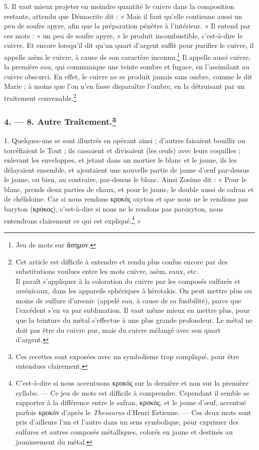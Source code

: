 \documentclass[a4paper, 11pt, oneside, polutonikogreek, french]{article}
\begin{document}
5. Il vaut mieux projeter en moindre quantité le cuivre dans la composition restante, attendu que Démocrite dit : « Mais il faut qu'elle contienne aussi un peu de soufre apyre, afin que la préparation pénètre à l'intérieur. » Il entend par ces mots : « un peu de soufre apyre, » le produit incombustible, c'est-à-dire le cuivre. Et encore lorsqu'il dit qu'un quart d'argent suffit pour purifier le cuivre, il appelle asèm le cuivre, à cause de son caractère inconnu.\footnote{Jeu de mots sur ἄσημον.} Il appelle aussi cuivre, la première eau, qui communique une teinte sombre et fugace, en l'assimilant au cuivre obscurci. En effet, le cuivre ne se produit jamais sans ombre, comme le dit Marie ; à moins que l'on n'en fasse disparaître l'ombre, en la détruisant par un traitement convenable.\footnote{Cet article est difficile à entendre et rendu plus confus encore par des substitutions voulues entre les mots cuivre, asèm, eaux, etc.\\\hspace*{5mm}Il paraît s'appliquer à la coloration du cuivre par les composés sulfurés et arsénicaux, dans les appareils sphériques à kérotakis. On peut mettre plus ou moins de sulfure d'arsenic (appelé eau, à cause de sa fusibilité), parce que l'excédent s'en va par sublimation. Il vaut même mieux en mettre plus, pour que la teinture du métal s'effectue à une plus grande profondeur. Le métal ne doit pas être du cuivre pur, mais du cuivre mélangé avec son quart d'argent.}
\clearpage
\bigskip
\centerline{\EightStarTaper}
\centerline{\EightStarTaper\EightStarTaper}
\bigskip

\subsubsection[4. --- 8. Autre Traitement.]{4. --- 8. Autre Traitement.\footnote{Ces recettes sont exposées avec un symbolisme trop compliqué, pour être entendues clairement.}}

1. Quelques-uns se sont illustrés en opérant ainsi ; d'autres faisaient bouillir ou torréfiaient le Tout ; ils cassaient et divisaient (les œufs) avec leurs coquilles ; enlevant les enveloppes, et jetant dans un mortier le blanc et le jaune, ils les délayaient ensemble, et ajoutaient une nouvelle partie de jaune d'œuf par-dessus le jaune, ou bien, au contraire, par-dessus le blanc. Ainsi Zosime dit : « Pour le blanc, prends deux parties de chaux, et pour le jaune, le double aussi de safran et de chélidoine. Car si nous rendons κροκὸς oxyton et que nous ne le rendions pas baryton (κρόκος), c'est-à-dire si nous ne le rendons pas paroxyton, nous entendrons clairement ce qui est expliqué.\footnote{C'est-à-dire si nous accentuons κροκός sur la dernière et non sur la première syllabe. --- Ce jeu de mots est difficile à comprendre. Cependant il semble se rapporter à la différence entre le safran, κροκός, et le jaune d'œuf, accentué parfois κροκόν d'après le \emph{Thesaurus} d'Henri Estienne. --- Ces deux mots sont pris d'ailleurs l'un et l'autre dans un sens symbolique, pour exprimer des sulfures et autres composés métalliques, colorés en jaune et destinés au jaunissement du métal.} »
\end{document}
